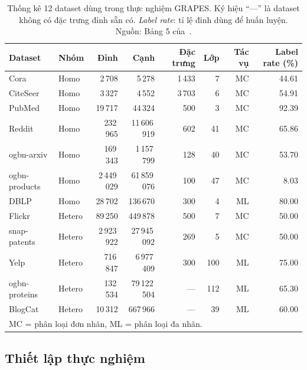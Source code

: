 \begin{table}[H]
\centering
\caption{Thống kê 12 dataset dùng trong thực nghiệm GRAPES. Ký hiệu ``---'' là dataset không có đặc trưng đỉnh sẵn có. \textit{Label rate}: tỉ lệ đỉnh dùng để huấn luyện. Nguồn: Bảng 5 của~\cite{Younesian2023GRAPES}.}
\label{tab:datasets}
\small
\setlength{\tabcolsep}{4pt}
\begin{tabular}{l l r r r r r r}
\toprule
\textbf{Dataset} & \textbf{Nhóm} & \textbf{Đỉnh} & \textbf{Cạnh} & \textbf{Đặc trưng} & \textbf{Lớp} & \textbf{Tác vụ} & \textbf{Label rate (\%)} \\
\midrule
Cora           & Homo & 2\,708        & 5\,278          & 1\,433  & 7   & MC  & 44.61 \\
CiteSeer       & Homo & 3\,327        & 4\,552          & 3\,703  & 6   & MC  & 54.91 \\
PubMed         & Homo & 19\,717       & 44\,324         & 500     & 3   & MC  & 92.39 \\
Reddit         & Homo & 232\,965      & 11\,606\,919    & 602     & 41  & MC  & 65.86 \\
ogbn-arxiv     & Homo & 169\,343      & 1\,157\,799     & 128     & 40  & MC  & 53.70 \\
ogbn-products  & Homo & 2\,449\,029   & 61\,859\,076    & 100     & 47  & MC  & 8.03  \\
DBLP           & Homo & 28\,702       & 136\,670        & 300     & 4   & ML  & 80.00 \\
\midrule
Flickr         & Hetero & 89\,250     & 449\,878        & 500     & 7   & MC  & 50.00 \\
snap-patents   & Hetero & 2\,923\,922 & 27\,945\,092    & 269     & 5   & MC  & 50.00 \\
Yelp           & Hetero & 716\,847    & 6\,977\,409     & 300     & 100 & ML  & 75.00 \\
ogbn-proteins  & Hetero & 132\,534    & 79\,122\,504    & ---     & 112 & ML  & 65.30 \\
BlogCat        & Hetero & 10\,312     & 667\,966        & ---     & 39  & ML  & 60.00 \\
\bottomrule
\multicolumn{8}{l}{\footnotesize MC = phân loại đơn nhãn, ML = phân loại đa nhãn.}
\end{tabular}
\end{table}

\subsection{Thiết lập thực nghiệm}

